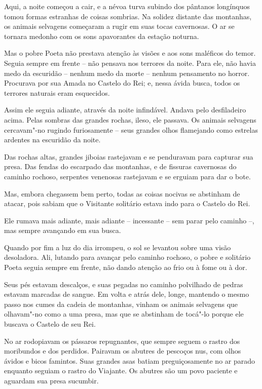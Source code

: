 Aqui, a noite começou a cair, e a névoa turva subindo dos pântanos
longínquos tomou formas estranhas de coisas sombrias. Na solidez
distante das montanhas, os animais selvagens começaram a rugir em suas
tocas cavernosas. O ar se tornara medonho com os sons apavorantes da
estação noturna.

Mas o pobre Poeta não prestava atenção às visões e aos sons maléficos do
temor. Seguia sempre em frente -- não pensava nos terrores da noite.
Para ele, não havia medo da escuridão -- nenhum medo da morte -- nenhum
pensamento no horror. Procurava por sua Amada no Castelo do Rei; e,
nessa ávida busca, todos os terrores naturais eram esquecidos.

Assim ele seguia adiante, através da noite infindável. Andava pelo desfiladeiro
acima. Pelas sombras das grandes rochas, ileso, ele
passava. Os animais selvagens cercavam"-no rugindo furiosamente -- seus
grandes olhos flamejando como estrelas ardentes na escuridão da
noite.

Das rochas altas, grandes jiboias rastejavam e se penduravam para
capturar sua presa. Das fendas do escarpado das montanhas, e de fissuras
cavernosas do caminho rochoso, serpentes venenosas rastejavam e se
erguiam para dar o bote.

Mas, embora chegassem bem perto, todas as coisas nocivas se abstinham de
atacar, pois sabiam que o Visitante solitário estava indo para o Castelo
do Rei.

Ele rumava mais adiante, mais adiante -- incessante -- sem parar pelo
caminho --, mas sempre avançando em sua busca.

Quando por fim a luz do dia irrompeu, o sol se levantou sobre uma visão
desoladora. Ali, lutando para avançar pelo caminho rochoso, o pobre e
solitário Poeta seguia sempre em frente, não dando atenção ao frio ou à
fome ou à dor.

Seus pés estavam descalços, e suas pegadas no caminho polvilhado de
pedras estavam marcadas de sangue. Em volta e atrás dele, longe, mantendo
o mesmo passo nos cumes da cadeia de montanhas, vinham os animais
selvagens que olhavam"-no como a uma presa, mas que se abstinham de
tocá"-lo porque ele buscava o Castelo de seu Rei.

No ar rodopiavam os pássaros repugnantes, que sempre seguem o rastro dos
moribundos e dos perdidos. Pairavam os abutres de pescoços nus, com
olhos ávidos e bicos famintos. Suas grandes asas batiam preguiçosamente
no ar parado enquanto seguiam o rastro do Viajante. Os abutres são um
povo paciente e aguardam sua presa sucumbir.

